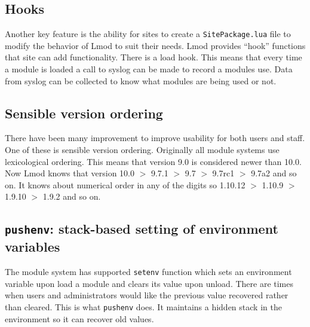 \subsection{Hooks}

Another key feature is the ability for sites to create a
\texttt{SitePackage.lua} file to modify the behavior of Lmod to suit
their needs.  Lmod provides ``hook'' functions that site can add
functionality.  There is a load hook.  This means that
every time a module is loaded a call to syslog can be
made to record a modules use.  Data from syslog can be collected to
know what modules are being used or not.

\subsection{Sensible version ordering}

There have been many improvement to improve usability for both users
and staff.  One of these is sensible version ordering.  Originally all
module systems use lexicological ordering.  This means that version
9.0 is considered newer than 10.0.  Now Lmod knows that version 10.0 $>$
9.7.1 $>$ 9.7 $>$ 9.7rc1 $>$ 9.7a2 and so on.  It knows about
numerical order in any of the digits so 1.10.12 $>$ 1.10.9 $>$ 1.9.10 $>$ 1.9.2
and so on.


\subsection{\texttt{pushenv}: stack-based setting of environment variables}
\label{sec:lmod_pushenv}

The module system
has supported \texttt{setenv} function which sets an environment variable
upon load a module and clears its value upon unload.  There are times
when users and administrators would like the previous value recovered
rather than cleared.  This is what \texttt{pushenv} does.  It
maintains a hidden stack in the environment so it can recover old
values.

